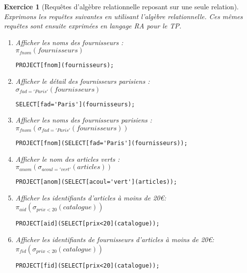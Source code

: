 \documentclass{article}
\theoremstyle{exostyle}
\newtheorem{exercice}{Exercice}
\newenvironment{questions}{

\begin{enumerate}[\hspace{12pt}\bfseries\itshape 1.]}{
\end{enumerate}

} %
\begin{document}

\noindent\hrulefill
\vspace{0.5cm}

\begin{exercice}[Requêtes d'algèbre relationnelle reposant sur une seule relation]
Exprimons les requêtes suivantes en utilisant l'algèbre
relationnelle. Ces mêmes requêtes sont ensuite exprimées en langage RA
pour le TP.

\begin{questions}
\item Afficher les noms des fournisseurs :\\
  $\pi_{fnom}(fournisseurs)$
\begin{verbatim}
PROJECT[fnom](fournisseurs);
\end{verbatim}

\item Afficher le détail des fournisseurs parisiens :\\
$\sigma_{fad='Paris'}(fournisseurs)$
\begin{verbatim}
SELECT[fad='Paris'](fournisseurs);
\end{verbatim}

\item Afficher les noms des fournisseurs parisiens :\\
$\pi_{fnom}(\sigma_{fad='Paris'}(fournisseurs))$
\begin{verbatim}
PROJECT[fnom](SELECT[fad='Paris'](fournisseurs));
\end{verbatim}

\item Afficher le nom des articles verts :\\
$\pi_{anom}(\sigma_{acoul='vert'}(articles))$
\begin{verbatim}
PROJECT[anom](SELECT[acoul='vert'](articles));
\end{verbatim}

\item Afficher les identifiants d'articles à moins de 20\euro :\\
$\pi_{aid}(\sigma_{prix<20}(catalogue))$
\begin{verbatim}
PROJECT[aid](SELECT[prix<20](catalogue));
\end{verbatim}

\item Afficher les identifiants de fournisseurs d'articles à moins de 20\euro :\\
$\pi_{fid}(\sigma_{prix<20}(catalogue))$
\begin{verbatim}
PROJECT[fid](SELECT[prix<20](catalogue));
\end{verbatim}


\end{questions}
\end{exercice}
\end{document}
